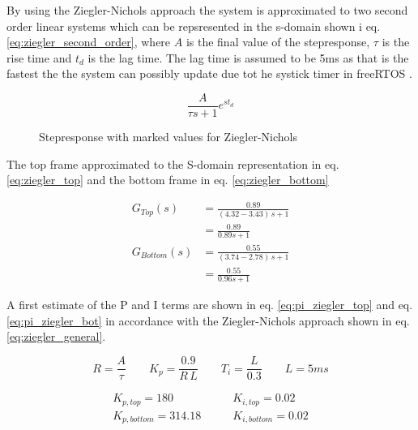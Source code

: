 \documentclass[../../../main]{subfiles}
\begin{document}
By using the Ziegler-Nichols approach the system is approximated to two second order linear systems
which can be repsresented in the s-domain shown i eq. \eqref{eq:ziegler_second_order}, where $A$ is
the final value of the stepresponse, $\tau$ is the rise time and $t_d$ is the lag time.
The lag time is assumed to be 5\si{ms} as that is the fastest the the system can possibly update due tot he systick timer in freeRTOS .

\begin{equation}
	\label{eq:ziegler_second_order}
	\frac{A}{\tau s+1}e^{st_d}
\end{equation}

\begin{figure}[h]
  \centering
	\def\svgwidth{1\textwidth}
  
  \caption{Stepresponse with marked values for Ziegler-Nichols}
  \label{fig:ziegler_step}
\end{figure}

The top frame approximated to the S-domain representation in eq. \eqref{eq:ziegler_top} and the bottom frame in eq. \eqref{eq:ziegler_bottom}

\begin{align}
	G_{Top}(s) &=\frac{0.89}{(4.32-3.43)\,s +1} \\
						 &=\frac{0.89}{0.89s +1}
	\label{eq:ziegler_top}\\
	G_{Bottom}(s) &=\frac{0.55}{(3.74-2.78)\,s +1}\\
								&=\frac{0.55}{0.96s+1}
	\label{eq:ziegler_bottom}
\end{align}

A first estimate of the P and I terms are shown in eq. \eqref{eq:pi_ziegler_top} and eq. \eqref{eq:pi_ziegler_bot} in accordance with the Ziegler-Nichols approach shown in eq. \eqref{eq:ziegler_general}.

\begin{equation}
	\label{eq:ziegler_general}
	R = \frac{A}{\tau} \qquad K_p = \frac{0.9}{R\,L}\qquad T_i=\frac{L}{0.3} \qquad L = 5\si{ms}
\end{equation}

\begin{align}
	\label{eq:pi_ziegler_top}
	K_{p,top} = 180 \qquad &K_{i,top} = 0.02\\
	\label{eq:pi_ziegler_bot}
	K_{p,bottom} = 314.18 \qquad &K_{i,bottom} = 0.02
\end{align}

\end{document}
